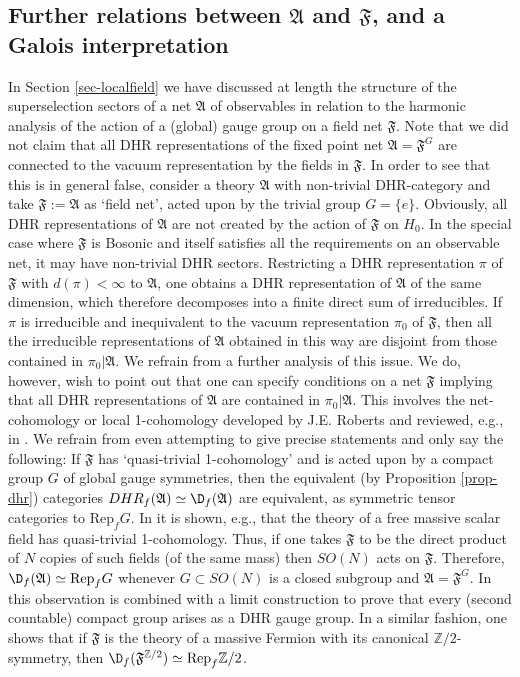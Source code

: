 \documentclass[12pt]{article}
\newcommand{\alg}[1]{\mathfrak{#1}}
\theoremstyle{definition}
\theoremstyle{definition}
\theoremstyle{remark}
\def\7#1{{\mathbb #1}}
\newcommand{\Rep}{\mathrm{Rep}}
\begin{document}
\subsection{Further relations between $\alg{A}$ and $\alg{F}$, and a Galois interpretation}
In Section \ref{sec-localfield} we have discussed at
length the structure of the superselection sectors of a
net $\alg{A}$ of observables in relation to the
harmonic analysis of the action of a (global) gauge
group on a field net $\alg{F}$. Note that we did not
claim that all DHR representations of the fixed point
net $\alg{A}=\alg{F}^G$ are connected to the vacuum
representation by the fields in $\alg{F}$. In order to
see that this is in general false, consider a theory
$\alg{A}$ with non-trivial DHR-category and take
$\alg{F}:=\alg{A}$ as `field net', acted upon by the
trivial group $G=\{e\}$. Obviously, all DHR
representations of $\alg{A}$ are not created by the
action of $\alg{F}$ on $H_0$. In the special case where
$\alg{F}$ is Bosonic and itself satisfies all the
requirements on an observable net, it may have
non-trivial DHR sectors. Restricting a DHR
representation $\pi$ of $\alg{F}$ with $d(\pi)<\infty$
to $\alg{A}$, one obtains a DHR representation of
$\alg{A}$ of the same dimension, which therefore
decomposes into a finite direct sum of irreducibles. If
$\pi$ is irreducible and inequivalent to the vacuum
representation $\pi_0$ of $\alg{F}$, then all the
irreducible representations of $\alg{A}$ obtained in
this way are disjoint from those contained in
$\pi_0|\alg{A}$. We refrain from a further analysis of
this issue.  We do, however, wish to point out that one
can specify conditions on a net $\alg{F}$ implying that
all DHR representations of $\alg{A}$ are contained in
$\pi_0|\alg{A}$. This involves the net-cohomology or
local 1-cohomology developed by J.E. Roberts and
reviewed, e.g., in \cite[\S 3.4]{rob-lec}. We refrain
from even attempting to give precise statements and
only say the following: If $\alg{F}$ has `quasi-trivial
1-cohomology' and is acted upon by a compact group $G$
of global gauge symmetries, then the equivalent (by
Proposition \ref{prop-dhr}) categories
$DHR_f(\alg{A})\simeq\D_f(\alg{A})$ are equivalent, as
symmetric tensor categories to $\Rep_fG$. In
\cite{goldstone} it is shown, e.g., that the theory of
a free massive scalar field has quasi-trivial
1-cohomology. Thus, if one takes $\alg{F}$ to be the
direct product of $N$ copies of such fields (of the
same mass) then $SO(N)$ acts on $\alg{F}$. Therefore,
$\D_f(\alg{A})\simeq\Rep_fG$ whenever $G\subset SO(N)$
is a closed subgroup and $\alg{A}=\alg{F}^G$. In
\cite{dop-groups} this observation is combined with a
limit construction to prove that every (second
countable) compact group arises as a DHR gauge
group. In a similar fashion, one shows that if
$\alg{F}$ is the theory of a massive Fermion with its
canonical $\7Z/2$-symmetry, then
$\D_f(\alg{F}^{\7Z/2})\simeq\Rep_f\7Z/2$.
\end{document}
